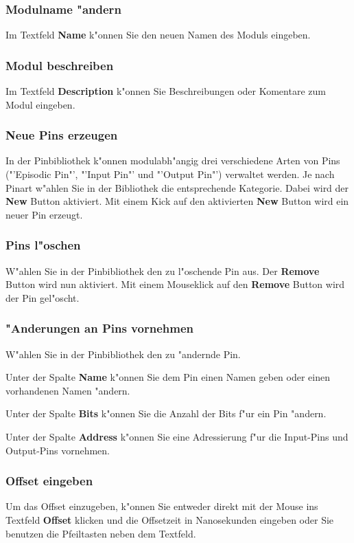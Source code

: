 \documentclass[a4paper,titlepage,12pt,ngerman]{scrbook}
\begin{document}
\subsubsection{Modulname "andern}
Im Textfeld {\bf Name} k"onnen Sie den neuen Namen des Moduls eingeben.
\subsubsection{Modul beschreiben}
Im Textfeld {\bf Description} k"onnen Sie Beschreibungen oder Komentare zum Modul eingeben.
\subsubsection{Neue Pins erzeugen}
In der Pinbibliothek k"onnen modulabh"angig drei verschiedene Arten von Pins ("'Episodic Pin"', "'Input Pin"' und "'Output Pin"') verwaltet werden. Je nach Pinart w"ahlen Sie in der Bibliothek die entsprechende Kategorie. Dabei wird der {\bf New} Button aktiviert. Mit einem Kick auf den aktivierten {\bf New} Button wird ein neuer Pin erzeugt. \par
\subsubsection{Pins l"oschen}
W"ahlen Sie in der Pinbibliothek den zu l"oschende Pin aus. Der {\bf Remove} Button wird nun aktiviert. Mit einem Mouseklick auf den {\bf Remove} Button wird der Pin gel"oscht.
\subsubsection{"Anderungen an Pins vornehmen}
W"ahlen Sie in der Pinbibliothek den zu "andernde Pin.\par
Unter der Spalte {\bf Name} k"onnen Sie dem Pin einen Namen geben oder einen vorhandenen Namen "andern.\par
Unter der Spalte {\bf Bits} k"onnen Sie die Anzahl der Bits f"ur ein Pin "andern.\par
Unter der Spalte {\bf Address} k"onnen Sie eine Adressierung f"ur die Input-Pins und Output-Pins vornehmen.\par
\subsubsection{Offset eingeben}
Um das Offset einzugeben, k"onnen Sie entweder direkt mit der Mouse ins Textfeld {\bf Offset} klicken und die Offsetzeit in Nanosekunden eingeben oder Sie benutzen die Pfeiltasten neben dem Textfeld. 
\end{document}
